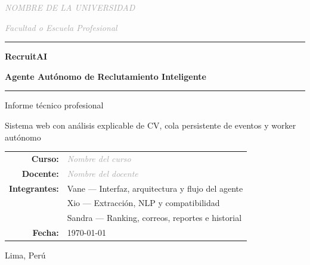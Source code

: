 \documentclass[12pt,a4paper]{article}
\newcommand{\projectname}{RecruitAI}
\newcommand{\projecttitle}{Agente Autónomo de Reclutamiento Inteligente}
\newcommand{\editable}[1]{\textcolor{darkgray}{\textit{#1}}}
\begin{document}
\begin{titlepage}
    \centering
    \vspace*{1.2cm}

    {\Large \editable{NOMBRE DE LA UNIVERSIDAD}\par}
    \vspace{0.35cm}
    {\large \editable{Facultad o Escuela Profesional}\par}
    \vspace{1.8cm}

    {\color{primary}\rule{\textwidth}{1.2pt}\par}
    \vspace{0.55cm}
    {\Huge\bfseries \projectname\par}
    \vspace{0.3cm}
    {\LARGE\bfseries \projecttitle\par}
    \vspace{0.55cm}
    {\color{primary}\rule{\textwidth}{1.2pt}\par}

    \vspace{1.5cm}
    {\Large Informe técnico profesional\par}
    \vspace{0.5cm}
    {\large Sistema web con análisis explicable de CV, cola persistente de eventos y worker autónomo\par}

    \vfill

    \begin{tabular}{>{\bfseries}rl}
        Curso: & \editable{Nombre del curso} \\
        Docente: & \editable{Nombre del docente} \\
        Integrantes: & Vane --- Interfaz, arquitectura y flujo del agente \\
                     & Xio --- Extracción, NLP y compatibilidad \\
                     & Sandra --- Ranking, correos, reportes e historial \\
        Fecha: & \today
    \end{tabular}

    \vfill
    {\large Lima, Perú\par}
\end{titlepage}

\tableofcontents
\newpage
\listoftables
\newpage
{}
\end{document}
